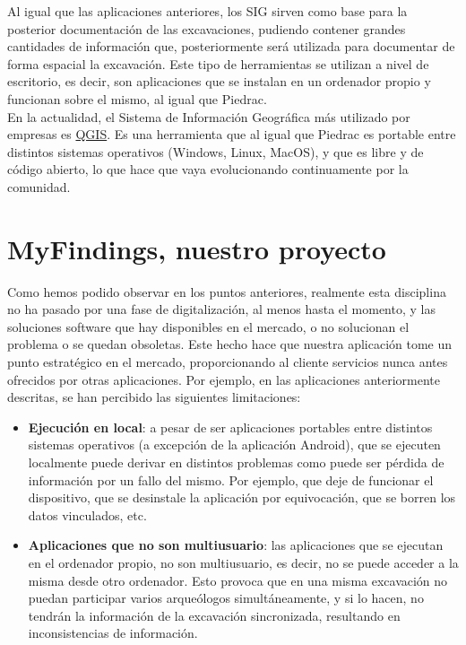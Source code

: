Al igual que las aplicaciones anteriores, los SIG sirven como base para la posterior
documentación de las excavaciones, pudiendo contener grandes cantidades de información
que, posteriormente será utilizada para documentar de forma espacial la excavación. Este
tipo de herramientas se utilizan a nivel de escritorio, es decir, son aplicaciones que
se instalan en un ordenador propio y funcionan sobre el mismo, al igual que Piedrac.\\

En la actualidad, el Sistema de Información Geográfica más utilizado por empresas es
\href{https://www.qgis.org/es/site/}{QGIS}. Es una herramienta que al igual que Piedrac
es portable entre distintos sistemas operativos (Windows, Linux, MacOS), y que es libre
y de código abierto, lo que hace que vaya evolucionando continuamente por la comunidad.

\section{MyFindings, nuestro proyecto}
Como hemos podido observar en los puntos anteriores, realmente esta disciplina no ha pasado
por una fase de digitalización, al menos hasta el momento, y las soluciones software que hay
disponibles en el mercado, o no solucionan el problema o se quedan obsoletas. Este hecho
hace que nuestra aplicación tome un punto estratégico en el mercado, proporcionando al
cliente servicios nunca antes ofrecidos por otras aplicaciones. Por ejemplo, en las
aplicaciones anteriormente descritas, se han percibido las siguientes limitaciones:

    \begin{itemize}
        \item \textbf{Ejecución en local}: a pesar de ser aplicaciones portables entre
        distintos sistemas operativos (a excepción de la aplicación Android), que se
        ejecuten localmente puede derivar en distintos problemas como puede ser pérdida
        de información por un fallo del mismo. Por ejemplo, que deje de funcionar el
        dispositivo, que se desinstale la aplicación por equivocación, que se borren los
        datos vinculados, etc.
        
        \item \textbf{Aplicaciones que no son multiusuario}: las aplicaciones que se
        ejecutan en el ordenador propio, no son multiusuario, es decir, no se puede
        acceder a la misma desde otro ordenador. Esto provoca que en una misma excavación
        no puedan participar varios arqueólogos simultáneamente, y si lo hacen, no tendrán
        la información de la excavación sincronizada, resultando en inconsistencias de
        información.
    \end{itemize}

